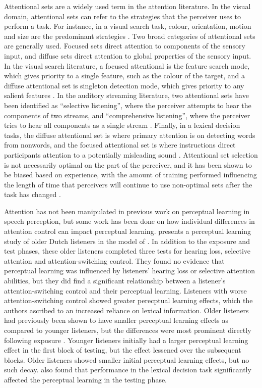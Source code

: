 Attentional sets are a widely used term in the attention literature.  
In the visual domain, attentional sets can refer to the strategies that the perceiver uses to perform a task.  
For instance, in a visual search task, colour, orientation, motion and size are the predominant strategies \citep{Wolfe2004}.  
Two broad categories of attentional sets are generally used.  
Focused sets direct attention to components of the sensory input, and diffuse sets direct attention to global properties of the sensory input.  
In the visual search literature, a focused attentional is the feature search mode, which gives priority to a single feature, such as the colour of the target, and a diffuse attentional set is singleton detection mode, which gives priority to any salient features \citep{Bacon1994}. 
In the auditory streaming literature, two attentional sets have been identified as ``selective listening'', where the perceiver attempts to hear the components of two streams, and ``comprehensive listening'', where the perceiver tries to hear all components as a single stream  \citep{vanNoorden1975}.
Finally, in a lexical decision tasks, the diffuse attentional set is where primary attention is on detecting words from nonwords, and the focused attentional set is where instructions direct participants attention to a potentially misleading sound \citep{Pitt2012}.
Attentional set selection is not necessarily optimal on the part of the perceiver, and it has been shown to be biased based on experience, with the amount of training performed influencing the length of time that perceivers will continue to use non-optimal sets after the task has changed \citep{Leber2006}.  

Attention has not been manipulated in previous work on perceptual learning in speech perception, but some work has been done on how individual differences in attention control can impact perceptual learning.
\citet{Scharenborg2014} presents a perceptual learning study of older Dutch listeners in the model of \citet{Norris2003}.  
In addition to the exposure and test phases, these older listeners completed three tests for hearing loss, selective attention and attention-switching control.  
They found no evidence that perceptual learning was influenced by listeners' hearing loss or selective attention abilities, but they did find a significant relationship between a listener's attention-switching control and their perceptual learning.  
Listeners with worse attention-switching control showed greater perecptual learning effects, which the authors ascribed to an increased reliance on lexical information.  
Older listeners had previously been shown to have smaller perceptual learning effects as compared to younger listeners, but the differences were most prominent directly following exposure \citep{Scharenborg2013}.  
Younger listeners initially had a larger perceptual learning effect in the first block of testing, but the effect lessened over the subsequent blocks.  
Older listeners showed smaller initial perceptual learning effects, but no such decay.  
\citet{Scharenborg2013} also found that performance in the lexical decision task significantly affected the perceptual learning in the testing phase.

